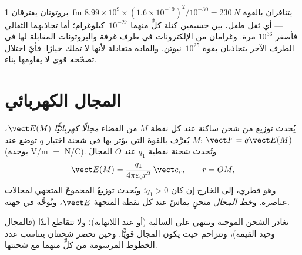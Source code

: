 \begin{example}[كم هي قوية]\label{ex:b1:electrostatics-gauss:strong}
بروتونان يفترقان \qty{1}{fm} يتنافران بالقوة $8.99 \times 10^9 \times (1.6 \times
10^{-19})^2/10^{-30} = \qty{230}{N}$ --- أي ثقل طفل، بين
جسيمين كتلة كلٍّ منهما $10^{-27}$~كيلوغرام؛ أما تجاذبهما الثقالي
فأصغر $10^{36}$ مرة. وغرامان من الإلكترونات في طرف غرفة
والبروتونات المقابلة لها في الطرف الآخر يتجاذبان بقوة $10^{25}$~نيوتن.
والمادة متعادلة لأنها لا تملك خيارًا: فأيّ اختلال تصحّحه
قوى لا يقاومها بناء.
\end{example}

\section{المجال الكهربائي}

\begin{definition}\label{def:b1:electrostatics-gauss:field}
يُحدث توزيع من شحن ساكنة عند كل نقطة $M$ من الفضاء
\emph{مجالًا كهربائيًّا} $\vect E(M)$، يُعرَّف بالقوة التي يؤثر بها في
شحنة اختبار $q$ توضع عند $M$: $\vect F = q\vect E(M)$ (بوحدة \unit{V/m} $=$
\unit{N/C}). وتُحدث شحنة نقطية $q_1$ عند $O$ المجالَ
\[
\vect E(M) = \frac{q_1}{4\pi\varepsilon_0 r^2}\,\vect e_r , \qquad r = OM ,
\]
وهو قطري، إلى الخارج إن كان $q_1 > 0$؛ ويُحدث توزيعٌ المجموعَ المتجهي
لمجالات عناصره. و\emph{خط المجال} منحنٍ يماسّ عند كل
نقطة المتجهةَ $\vect E$، ويُوجَّه في جهته.
\end{definition}

\begin{proposition}\label{prop:b1:electrostatics-gauss:lines}
تغادر  الشحن الموجبة وتنتهي على السالبة (أو عند
اللانهاية)؛ ولا تتقاطع أبدًا (فالمجال وحيد القيمة)، وتتزاحم
حيث يكون المجال قويًّا. وحين تحضر شحنتان يتناسب عدد
الخطوط المرسومة من كلٍّ منهما مع شحنتها.
\end{proposition}

